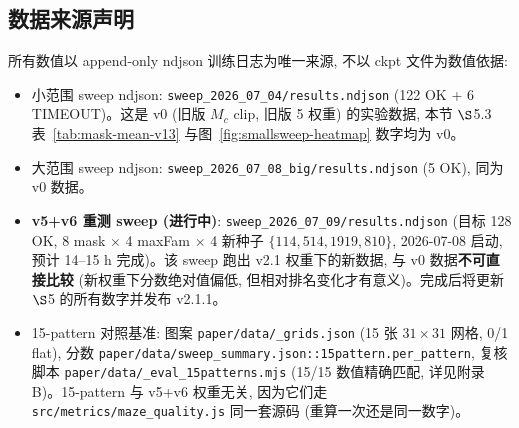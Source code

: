 \subsection{数据来源声明}

所有数值以 append-only ndjson 训练日志为唯一来源, 不以 ckpt 文件为数值依据:
\begin{itemize}[leftmargin=*, itemsep=0pt, topsep=0pt]
  \item 小范围 sweep ndjson: \texttt{sweep\_2026\_07\_04/results.ndjson} (122 OK + 6 TIMEOUT)。这是 v0 (旧版 $M_c$ clip, 旧版 5 权重) 的实验数据, 本节 $\S$5.3 表~\ref{tab:mask-mean-v13} 与图~\ref{fig:smallsweep-heatmap} 数字均为 v0。
  \item 大范围 sweep ndjson: \texttt{sweep\_2026\_07\_08\_big/results.ndjson} (5 OK), 同为 v0 数据。
  \item \textbf{v5+v6 重测 sweep (进行中)}: \texttt{sweep\_2026\_07\_09/results.ndjson} (目标 128 OK, 8 mask $\times$ 4 maxFam $\times$ 4 新种子 $\{114, 514, 1919, 810\}$, 2026-07-08 启动, 预计 14--15 h 完成)。该 sweep 跑出 v2.1 权重下的新数据, 与 v0 数据\textbf{不可直接比较} (新权重下分数绝对值偏低, 但相对排名变化才有意义)。完成后将更新 $\S$5 的所有数字并发布 v2.1.1。
  \item 15-pattern 对照基准: 图案 \texttt{paper/data/\_grids.json} (15 张 $31{\times}31$ 网格, 0/1 flat), 分数 \texttt{paper/data/sweep\_summary.json::15pattern.per\_pattern}, 复核脚本 \texttt{paper/data/\_eval\_15patterns.mjs} (15/15 数值精确匹配, 详见附录 B)。15-pattern 与 v5+v6 权重无关, 因为它们走 \texttt{src/metrics/maze\_quality.js} 同一套源码 (重算一次还是同一数字)。
\end{itemize}
